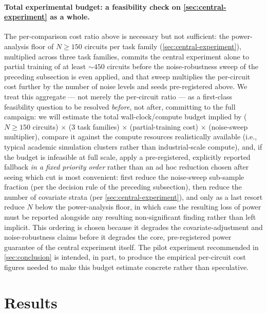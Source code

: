 \documentclass[11pt]{article}
\begin{document}
\paragraph{Total experimental budget: a feasibility check on \cref{sec:central-experiment} as a whole.} The per-comparison cost ratio above is necessary but not sufficient: the power-analysis floor of $N \geq 150$ circuits per task family (\cref{sec:central-experiment}), multiplied across three task families, commits the central experiment alone to partial training of at least $\sim 450$ circuits before the noise-robustness sweep of the preceding subsection is even applied, and that sweep multiplies the per-circuit cost further by the number of noise levels and seeds pre-registered above. We treat this aggregate --- not merely the per-circuit ratio --- as a first-class feasibility question to be resolved \emph{before}, not after, committing to the full campaign: we will estimate the total wall-clock/compute budget implied by ($N\!\ge\!150$ circuits) $\times$ (3 task families) $\times$ (partial-training cost) $\times$ (noise-sweep multiplier), compare it against the compute resources realistically available (i.e., typical academic simulation clusters rather than industrial-scale compute), and, if the budget is infeasible at full scale, apply a pre-registered, explicitly reported fallback \emph{in a fixed priority order} rather than an ad hoc reduction chosen after seeing which cut is most convenient: first reduce the noise-sweep sub-sample fraction (per the decision rule of the preceding subsection), then reduce the number of covariate strata (per \cref{sec:central-experiment}), and only as a last resort reduce $N$ below the power-analysis floor, in which case the resulting loss of power must be reported alongside any resulting non-significant finding rather than left implicit. This ordering is chosen because it degrades the covariate-adjustment and noise-robustness claims before it degrades the core, pre-registered power guarantee of the central experiment itself. The pilot experiment recommended in \cref{sec:conclusion} is intended, in part, to produce the empirical per-circuit cost figures needed to make this budget estimate concrete rather than speculative.

\section{Results}
\label{sec:results}
\end{document}
